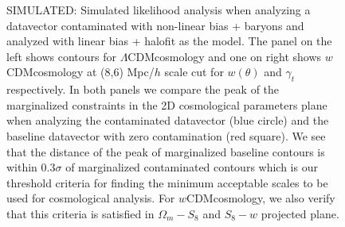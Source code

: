 \documentclass[fleqn,usenatbib]{mnras}
\newcommand{\lcdm}{$\Lambda$CDM}
\newcommand{\wcdm}{$w$CDM}
\begin{document}
\begin{figure}
\centering
{}
\hfill
{}
    \caption[]{SIMULATED: Simulated likelihood analysis when analyzing a datavector contaminated with non-linear bias + baryons and analyzed with linear bias + halofit as the model. The panel on the left shows contours for \lcdm cosmology and one on right shows \wcdm cosmology at (8,6) Mpc/$h$ scale cut for $w(\theta)$ and $\gamma_t$ respectively. In both panels we compare the peak of the marginalized constraints in the 2D cosmological parameters plane when analyzing the contaminated datavector (blue circle) and the baseline datavector with zero contamination (red square). We see that the distance of the peak of marginalized baseline contours is within 0.3$\sigma$ of marginalized contaminated contours which is our threshold criteria for finding the minimum acceptable scales to be used for cosmological analysis. For \wcdm cosmology, we also verify that this criteria is satisfied in $\Omega_m-S_8$ and $S_8-w$ projected plane.}
\end{figure}
\end{document}
